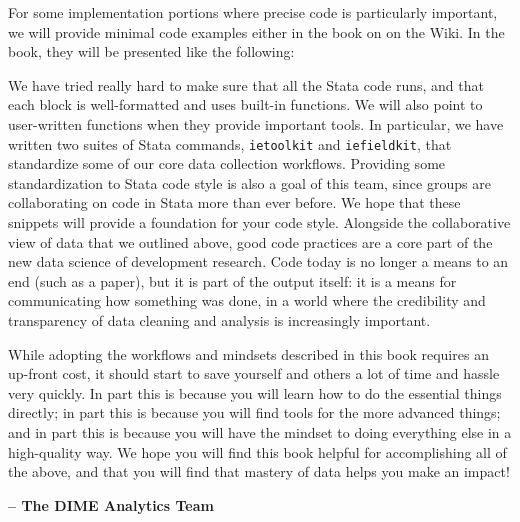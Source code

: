 For some implementation portions where precise code is particularly important,
we will provide minimal code examples either in the book on on the Wiki.
In the book, they will be presented like the following:


{
}

We have tried really hard to make sure that all the Stata code runs,
and that each block is well-formatted and uses built-in functions.
We will also point to user-written functions when they provide important tools.
In particular, we have written two suites of Stata commands,
\texttt{ietoolkit} and \texttt{iefieldkit},
that standardize some of our core data collection workflows.
Providing some standardization to Stata code style is also a goal of this team,
since groups are collaborating on code in Stata more than ever before.
We hope 
that these snippets will provide a foundation for your code style.
Alongside the collaborative view of data that we outlined above,
good code practices are a core part of the new data science of development research.
Code today is no longer a means to an end (such as a paper),
but it is part of the output itself: it is a means for communicating how something was done,
in a world where the credibility and transparency of data cleaning and analysis is increasingly important.

While adopting the workflows and mindsets described in this book
requires an up-front cost,
it should start to save yourself and others a lot of time and hassle very quickly.
In part this is because you will learn how to do the essential things directly;
in part this is because you will find tools for the more advanced things;
and in part this is because you will have the mindset to doing everything else in a high-quality way.
We hope you will find this book helpful for accomplishing all of the above,
and that you will find that mastery of data helps you make an impact!

\textbf{-- The DIME Analytics Team}

\mainmatter
